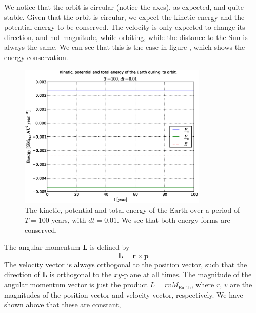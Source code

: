 %
We notice that the orbit is circular (notice the axes), as expected, and quite
stable.
%
%
Given that the orbit is circular, we expect the kinetic energy and the potential
energy to be conserved. The velocity is only expected to change its direction,
and not magnitude,
while orbiting, while the distance to the Sun is always the same. We can see
that this is the case in figure , which shows the energy
conservation.
%
\begin{figure}[htpb]
	\centering
	\includegraphics[width=0.8\textwidth]{figures/earth_energy_dt1e-2}
	\caption{The kinetic, potential and total energy of the Earth over a period
	of $T = 100$ years, with $dt = 0.01$. We see that both energy forms are
	conserved.}
	\label{fig:energycons}
\end{figure}
%
The angular momentum $\mathbf{L}$ is defined by
\begin{equation*}
	\mathbf{L} = \mathbf{r} \times\mathbf{p}
\end{equation*}
%
The velocity vector is always orthogonal to the position vector, such that the
direction of $\mathbf{L}$ is orthogonal to the $xy$-plane at all times. The
magnitude of the angular momentum vector is just the product $L =
rvM_{\text{Earth}}$, where $r$, $v$ are the magnitudes of the position vector
and velocity vector, respectively. We have shown above that these are constant,
